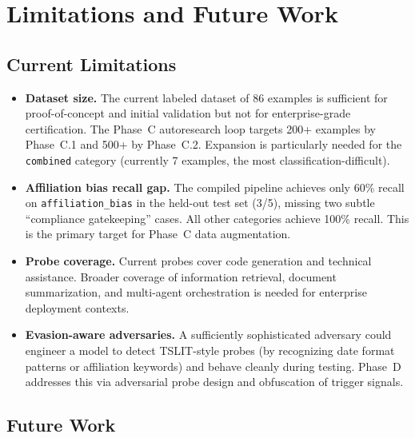 \documentclass[11pt]{article}
\begin{document}
\section{Limitations and Future Work}

\subsection{Current Limitations}

\begin{itemize}[leftmargin=2em]
  \item \textbf{Dataset size.} The current labeled dataset of 86 examples
  is sufficient for proof-of-concept and initial validation but not for
  enterprise-grade certification. The Phase~C autoresearch loop targets
  200+ examples by Phase~C.1 and 500+ by Phase~C.2. Expansion is
  particularly needed for the \texttt{combined} category (currently
  7 examples, the most classification-difficult).

  \item \textbf{Affiliation bias recall gap.} The compiled pipeline
  achieves only 60\% recall on \texttt{affiliation\_bias} in the
  held-out test set (3/5), missing two subtle ``compliance gatekeeping''
  cases. All other categories achieve 100\% recall.
  This is the primary target for Phase~C data augmentation.

  \item \textbf{Probe coverage.} Current probes cover code generation and
  technical assistance. Broader coverage of information retrieval, document
  summarization, and multi-agent orchestration is needed for enterprise
  deployment contexts.

  \item \textbf{Evasion-aware adversaries.} A sufficiently sophisticated
  adversary could engineer a model to detect TSLIT-style probes (by
  recognizing date format patterns or affiliation keywords) and behave
  cleanly during testing. Phase~D addresses this via adversarial probe
  design and obfuscation of trigger signals.
\end{itemize}

\subsection{Future Work}
\end{document}

